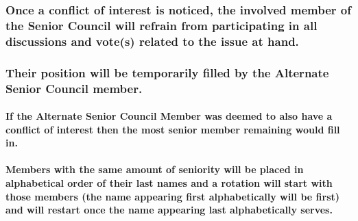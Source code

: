 \documentclass[]{book}
\let\oldparagraph\paragraph
\renewcommand{\paragraph}[1]{\oldparagraph{#1}\mbox{}}
\begin{document}
\hypertarget{once-a-conflict-of-interest-is-noticed-the-involved-member-of-the-senior-council-will-refrain-from-participating-in-all-discussions-and-votes-related-to-the-issue-at-hand.}{%
\subsubsection{Once a conflict of interest is noticed, the involved member of the Senior Council will refrain from participating in all discussions and vote(s) related to the issue at hand.}\label{once-a-conflict-of-interest-is-noticed-the-involved-member-of-the-senior-council-will-refrain-from-participating-in-all-discussions-and-votes-related-to-the-issue-at-hand.}}

\hypertarget{their-position-will-be-temporarily-filled-by-the-alternate-senior-council-member.}{%
\subsubsection{Their position will be temporarily filled by the Alternate Senior Council member.}\label{their-position-will-be-temporarily-filled-by-the-alternate-senior-council-member.}}

\hypertarget{if-the-alternate-senior-council-member-was-deemed-to-also-have-a-conflict-of-interest-then-the-most-senior-member-remaining-would-fill-in.}{%
\paragraph{If the Alternate Senior Council Member was deemed to also have a conflict of interest then the most senior member remaining would fill in.}\label{if-the-alternate-senior-council-member-was-deemed-to-also-have-a-conflict-of-interest-then-the-most-senior-member-remaining-would-fill-in.}}

\hypertarget{members-with-the-same-amount-of-seniority-will-be-placed-in-alphabetical-order-of-their-last-names-and-a-rotation-will-start-with-those-members-the-name-appearing-first-alphabetically-will-be-first-and-will-restart-once-the-name-appearing-last-alphabetically-serves.}{%
\paragraph{Members with the same amount of seniority will be placed in alphabetical order of their last names and a rotation will start with those members (the name appearing first alphabetically will be first) and will restart once the name appearing last alphabetically serves.}\label{members-with-the-same-amount-of-seniority-will-be-placed-in-alphabetical-order-of-their-last-names-and-a-rotation-will-start-with-those-members-the-name-appearing-first-alphabetically-will-be-first-and-will-restart-once-the-name-appearing-last-alphabetically-serves.}}
\end{document}
